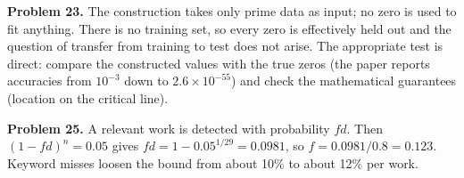 \textbf{Problem 23.} The construction takes only prime data as input; no zero is used to fit anything. There is no training set, so every zero is effectively held out and the question of transfer from training to test does not arise. The appropriate test is direct: compare the constructed values with the true zeros (the paper reports accuracies from $10^{-3}$ down to $2.6\times10^{-55}$) and check the mathematical guarantees (location on the critical line).

\textbf{Problem 25.} A relevant work is detected with probability $fd$. Then $(1-fd)^{n}=0.05$ gives $fd=1-0.05^{1/29}=0.0981$, so $f=0.0981/0.8=0.123$. Keyword misses loosen the bound from about 10\% to about 12\% per work.
